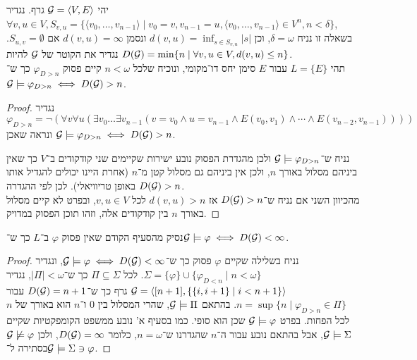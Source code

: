 \subquestion{}
יהי $\mathcal{G} = \langle V, E \rangle$ גרף.
נגדיר $\forall v, u \in V, S_{v, u} = \{ \langle v_0, \dots, v_{n - 1} \rangle \mid v_0 = v, v_{n - 1} = u, \langle v_0, \dots, v_{n - 1} \rangle \in V^n, n < \delta \}$, \\
בשאלה זו נניח $\delta = \omega$, וכן $d(v, u) = \inf_{s \in S_{v, u}} |s|$ ונסמן $d(v, u) = \infty$ אם $S_{u, v} = \emptyset$.
נגדיר את הקוטר של $\mathcal{G}$ להיות $D(\mathcal{G}) = \min \{ n \mid \forall v, u \in V, d(v, u) \le n \}$. \\
תהי $L = \{ E \}$ עבור $E$ סימן יחס דו־מקומי, ונוכיח שלכל $n < \omega$ קיים פסוק $\varphi_{D > n}$ כך ש־$\mathcal{G} \models \varphi_{D > n} \iff D(\mathcal{G}) > n$.
\begin{proof}
	נגדיר
	\[
		\varphi_{D > n}
		= \lnot (\forall v \forall u (\exists v_0 \dots \exists v_{n - 1} (v = v_0 \land u = v_{n - 1} \land E(v_0, v_1) \land \cdots \land E(v_{n - 2}, v_{n - 1}))))
	\]
	ונראה שאכן $\mathcal{G} \models \varphi_{D > n} \iff D(\mathcal{G}) > n$.

	נניח ש־$\mathcal{G} \models \varphi_{D > n}$ ולכן מהגדרת הפסוק נובע ישירות שקיימים שני קודקודים ב־$V$ כך שאין ביניהם מסלול באורך $n$, ולכן אין ביניהם גם מסלול קטן מ־$n$ (אחרת היינו יכולים להגדיל אותו באופן טריוויאלי).
	לכן לפי ההגדרה $D(\mathcal{G}) > n$. \\
	מהכיוון השני אם נניח ש־$D(\mathcal{G}) > n$ אז $d(v, u) > n$ לכל $v, u \in V$, ובפרט לא קיים מסלול באורך $n$ בין קודקודים אלה, וזהו תוכן הפסוק במדויק.
\end{proof}

\subquestion{}
נסיק מהסעיף הקודם שאין פסוק $\varphi$ ב־$L$ כך ש־$\mathcal{G} \models \varphi \iff D(\mathcal{G}) < \infty$.
\begin{proof}
	נניח בשלילה שקיים $\varphi$ פסוק כך ש־$\mathcal{G} \models \varphi \iff D(\mathcal{G}) < \infty$, ונגדיר $\Sigma = \{ \varphi \} \cup \{ \varphi_{D < n} \mid n < \omega \}$.
	לכל $\Pi \subseteq \Sigma$ כך ש־$|\Pi| < \omega$, נגדיר $\mathcal{G} = \langle [n + 1], \{ \{i, i + 1\} \mid i < n + 1 \} \rangle$ גרף כך ש־$D(\mathcal{G}) = n + 1$ עבור $n = \sup \{ n \mid \varphi_{D > n} \in \Pi \}$.
	בהתאם $\mathcal{G} \models \Pi$, שהרי המסלול בין $0$ ו־$n$ הוא באורך של $n$ לכל הפחות. בפרט $\mathcal{G} \models \varphi$ שכן הוא סופי.
	כמו בסעיף א' נובע ממשפט הקומפקטיות שקיים $\mathcal{G} \models \Sigma$, אבל בהתאם נובע עבור ה־$n$ שהגדרנו ש־$n = \omega$, כלומר $D(\mathcal{G}) = \infty$, ולכן $\mathcal{G} \not\models \varphi$ בסתירה ל־$\mathcal{G} \models \Sigma \ni \varphi$.
\end{proof}

